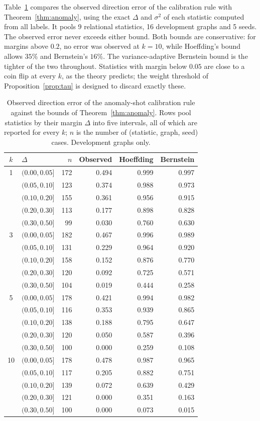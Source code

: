 \documentclass[pdflatex,sn-mathphys-ay]{sn-jnl}
\theoremstyle{plain}
\theoremstyle{remark}
\begin{document}
Table~\ref{tab:bound} compares the observed direction error of the calibration rule with Theorem~\ref{thm:anomaly}, using the exact $\Delta$ and $\sigma^2$ of each statistic computed from all labels. It pools 9 relational statistics, 16 development graphs and 5 seeds. The observed error never exceeds either bound. Both bounds are conservative: for margins above $0.2$, no error was observed at $k = 10$, while Hoeffding's bound allows $35\%$ and Bernstein's $16\%$. The variance-adaptive Bernstein bound is the tighter of the two throughout. Statistics with margin below $0.05$ are close to a coin flip at every $k$, as the theory predicts; the weight threshold of Proposition~\ref{prop:tau} is designed to discard exactly these.

\begin{table}[t]
\caption{Observed direction error of the anomaly-shot calibration rule against the bounds of Theorem~\ref{thm:anomaly}. Rows pool statistics by their margin $\Delta$ into five intervals, all of which are reported for every $k$; $n$ is the number of (statistic, graph, seed) cases. Development graphs only.}\label{tab:bound}
\centering\small
\begin{tabular}{@{}cl rrrr@{}}
\toprule
$k$ & $\Delta$ & $n$ & Observed & Hoeffding & Bernstein \\
\midrule
1 & $(0.00, 0.05]$ & 172 & 0.494 & 0.999 & 0.997 \\
 & $(0.05, 0.10]$ & 123 & 0.374 & 0.988 & 0.973 \\
 & $(0.10, 0.20]$ & 155 & 0.361 & 0.956 & 0.915 \\
 & $(0.20, 0.30]$ & 113 & 0.177 & 0.898 & 0.828 \\
 & $(0.30, 0.50]$ & 99 & 0.030 & 0.760 & 0.630 \\
\midrule
3 & $(0.00, 0.05]$ & 182 & 0.467 & 0.996 & 0.989 \\
 & $(0.05, 0.10]$ & 131 & 0.229 & 0.964 & 0.920 \\
 & $(0.10, 0.20]$ & 158 & 0.152 & 0.876 & 0.770 \\
 & $(0.20, 0.30]$ & 120 & 0.092 & 0.725 & 0.571 \\
 & $(0.30, 0.50]$ & 104 & 0.019 & 0.444 & 0.258 \\
\midrule
5 & $(0.00, 0.05]$ & 178 & 0.421 & 0.994 & 0.982 \\
 & $(0.05, 0.10]$ & 116 & 0.353 & 0.939 & 0.865 \\
 & $(0.10, 0.20]$ & 138 & 0.188 & 0.795 & 0.647 \\
 & $(0.20, 0.30]$ & 120 & 0.050 & 0.587 & 0.396 \\
 & $(0.30, 0.50]$ & 100 & 0.000 & 0.259 & 0.108 \\
\midrule
10 & $(0.00, 0.05]$ & 178 & 0.478 & 0.987 & 0.965 \\
 & $(0.05, 0.10]$ & 117 & 0.205 & 0.882 & 0.751 \\
 & $(0.10, 0.20]$ & 139 & 0.072 & 0.639 & 0.429 \\
 & $(0.20, 0.30]$ & 121 & 0.000 & 0.351 & 0.163 \\
 & $(0.30, 0.50]$ & 100 & 0.000 & 0.073 & 0.015 \\
\bottomrule
\end{tabular}
\end{table}
\end{document}
